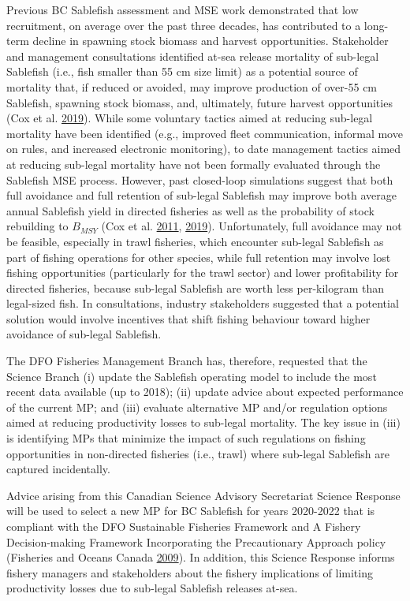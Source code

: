 \documentclass[11pt]{book}
\begin{document}
Previous BC Sablefish assessment and MSE work demonstrated that low recruitment, on average over the past three decades, has contributed to a long-term decline in spawning stock biomass and harvest opportunities. Stakeholder and management consultations identified at-sea release mortality of sub-legal Sablefish (i.e., fish smaller than 55 cm size limit) as a potential source of mortality that, if reduced or avoided, may improve production of over-55 cm Sablefish, spawning stock biomass, and, ultimately, future harvest opportunities (Cox et al. \protect\hyperlink{ref-cox2019evaluating}{2019}). While some voluntary tactics aimed at reducing sub-legal mortality have been identified (e.g., improved fleet communication, informal move on rules, and increased electronic monitoring), to date management tactics aimed at reducing sub-legal mortality have not been formally evaluated through the Sablefish MSE process. However, past closed-loop simulations suggest that both full avoidance and full retention of sub-legal Sablefish may improve both average annual Sablefish yield in directed fisheries as well as the probability of stock rebuilding to \(B_{MSY}\) (Cox et al. \protect\hyperlink{ref-cox2011management}{2011}, \protect\hyperlink{ref-cox2019evaluating}{2019}). Unfortunately, full avoidance may not be feasible, especially in trawl fisheries, which encounter sub-legal Sablefish as part of fishing operations for other species, while full retention may involve lost fishing opportunities (particularly for the trawl sector) and lower profitability for directed fisheries, because sub-legal Sablefish are worth less per-kilogram than legal-sized fish. In consultations, industry stakeholders suggested that a potential solution would involve incentives that shift fishing behaviour toward higher avoidance of sub-legal Sablefish.

The DFO Fisheries Management Branch has, therefore, requested that the Science Branch (i) update the Sablefish operating model to include the most recent data available (up to 2018); (ii) update advice about expected performance of the current MP; and (iii) evaluate alternative MP and/or regulation options aimed at reducing productivity losses to sub-legal mortality. The key issue in (iii) is identifying MPs that minimize the impact of such regulations on fishing opportunities in non-directed fisheries (i.e., trawl) where sub-legal Sablefish are captured incidentally.

Advice arising from this Canadian Science Advisory Secretariat Science Response will be used to select a new MP for BC Sablefish for years 2020-2022 that is compliant with the DFO Sustainable Fisheries Framework and A Fishery Decision-making Framework Incorporating the Precautionary Approach policy (Fisheries and Oceans Canada \protect\hyperlink{ref-DFO2009}{2009}). In addition, this Science Response informs fishery managers and stakeholders about the fishery implications of limiting productivity losses due to sub-legal Sablefish releases at-sea.
\end{document}
